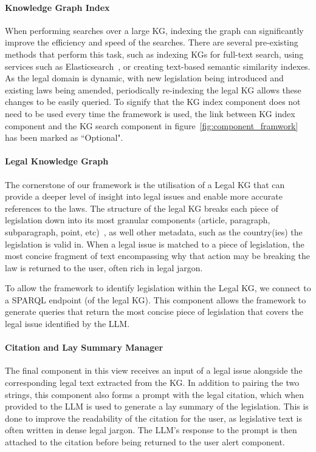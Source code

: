 \documentclass[sn-mathphys-num]{sn-jnl}%
\begin{document}
\paragraph{\textbf{Knowledge Graph Index}}
When performing searches over a large KG, indexing the graph can significantly improve the efficiency and speed of the searches. There are several pre-existing methods that perform this task, such as indexing KGs for full-text search, using services such as Elasticsearch~\cite{akdogan2015elasticsearch}, or creating text-based semantic similarity indexes. As the legal domain is dynamic, with new legislation being introduced and existing laws being amended, periodically re-indexing the legal KG allows these changes to be easily queried. To signify that the KG index component does not need to be used every time the framework is used, the link between KG index component and the KG search component in figure~\ref{fig:component_framwork} has been marked as ``Optional".

\paragraph{\textbf{Legal Knowledge Graph}}
The cornerstone of our framework is the utilisation of a Legal KG that can provide a deeper level of insight into legal issues and enable more accurate references to the laws. The structure of the legal KG breaks each piece of legislation down into its most granular components (article, paragraph, subparagraph, point, etc)~\cite{Europa_Publications_Office_2023}, as well other metadata, such as the country(ies) the legislation is valid in. When a legal issue is matched to a piece of legislation, the most concise fragment of text encompassing why that action may be breaking the law is returned to the user, often rich in legal jargon.

To allow the framework to identify legislation within the Legal KG, we connect to a SPARQL endpoint (of the legal KG). This component allows the framework to generate queries that return the most concise piece of legislation that covers the legal issue identified by the LLM.

\paragraph{\textbf{Citation and Lay Summary Manager}}
The final component in this view receives an input of a legal issue alongside the corresponding legal text extracted from the KG. In addition to pairing the two strings,
this component also forms a prompt with the legal citation, which when provided to the LLM is used to generate a lay summary of the legislation.
This is done to improve the readability of the citation for the user, as legislative text is often written in dense legal jargon. The LLM's response to the prompt is then attached to the citation before being returned to the user alert component.
\end{document}
